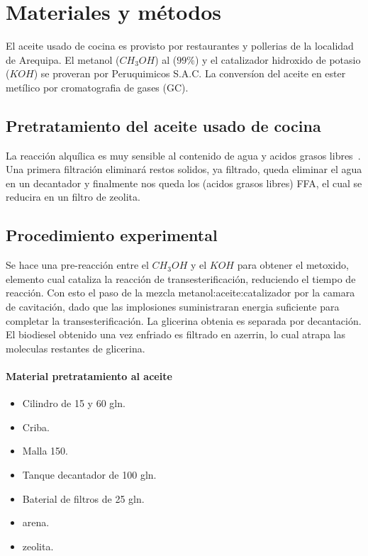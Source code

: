 \documentclass[a4paper,10pt]{article}
\begin{document}
\section{Materiales y métodos}
El aceite usado de cocina es provisto por restaurantes y pollerias de la localidad de Arequipa. 
El metanol ($CH_3 OH$) al ($99\%$) y el catalizador hidroxido de potasio ($KOH$) se proveran por Peruquimicos S.A.C. 
La conversíon del aceite en ester metílico por cromatografia de gases (GC).
\subsection{Pretratamiento del aceite usado de cocina}
La reacción alquílica es muy sensible al contenido de agua y acidos grasos libres~\cite{khosravi2016,zhang2003}.%
Una primera filtración eliminará restos solidos, ya filtrado, queda eliminar el agua en un decantador y finalmente nos queda 
los (acidos grasos libres) FFA, el cual se reducira en un filtro de zeolita.
\subsection{Procedimiento experimental}
Se hace una pre-reacción entre el $CH_3 OH$ y el $KOH$ para obtener el metoxido, elemento cual cataliza la reacción de transesterificación, 
reduciendo el tiempo de reacción.
Con esto el paso de la mezcla metanol:aceite:catalizador por la camara de cavitación, dado que las implosiones suministraran energia 
suficiente para completar la transesterificación.
La glicerina obtenia es separada por decantación. El biodiesel obtenido una vez enfriado es filtrado en azerrin, 
lo cual atrapa las moleculas restantes de glicerina. 
\paragraph{Material pretratamiento al aceite}
\begin{itemize}
 \item Cilindro de 15 y 60 gln.
 \item Criba.
 \item Malla 150.
 \item Tanque decantador de 100 gln.
 \item Baterial de filtros de 25 gln.
 \item arena.
 \item zeolita.
\end{itemize}
\end{document}
